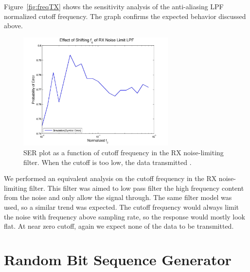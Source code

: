 \documentclass[]{article}
\begin{document}
Figure~\ref{fig:freqTX} shows the sensitivity analysis of the anti-aliasing LPF normalized cutoff frequency.  The graph confirms the expected behavior discussed above.

\begin{figure}[H]
\centering
\hspace*{-2cm}\includegraphics[width=0.7\textwidth]{freqRX.jpg}
\caption{SER plot as a function of cutoff frequency in the RX noise-limiting filter.  When the cutoff is too low, the data transmitted . \label{fig:freqRX}}
\end{figure}

We performed an equivalent analysis on the cutoff frequency in the RX noise-limiting filter.  This filter was aimed to low pass filter the high frequency content from the noise and only allow the signal through.  The same filter model was used, so a similar trend was expected.  The cutoff frequency would always limit the noise with frequency above sampling rate, so the response would mostly look flat.  At near zero cutoff, again we expect none of the data to be transmitted.



\appendix
\newpage


\newpage
%

\section{Random Bit Sequence Generator}
\label{app:random_bit_generator}

\end{document}
